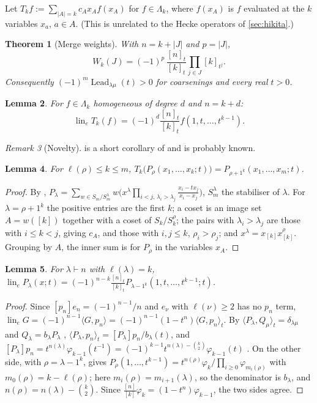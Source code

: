 \documentclass[11pt]{amsart}
\newtheorem{theorem}{Theorem}[section]
\newtheorem{lemma}[theorem]{Lemma}
\theoremstyle{definition}
\theoremstyle{remark}
\newtheorem{remark}[theorem]{Remark}
\numberwithin{equation}{section}
\newcommand{\lin}{\operatorname{lin}_e}
\newcommand{\Lead}{\operatorname{Lead}}
\newcommand{\Lam}{\Lambda}
\begin{document}
Let $T_kf:=\sum_{|A|=k}c_Ax_Af(x_A)$ for $f\in\Lam_k$, where $f(x_A)$ is $f$ evaluated at the $k$ variables $x_a$, $a\in A$. (This is unrelated to the Hecke operators of \cref{sec:hikita}.)

\begin{theorem}[Merge weights]\label{thm:W}
With $n=k+|J|$ and $p=|J|$,
\[ W_k(J)=(-1)^{p}\,\frac{[n]_t}{[k]_t}\prod_{j\in J}[k]_{t^{j}}. \]
Consequently $(-1)^m\Lead_{\lambda\mu}(t)>0$ for coarsenings and every real $t>0$.
\end{theorem}
\begin{lemma}\label{lem:linT}
For $f\in\Lam_k$ homogeneous of degree $d$ and $n=k+d$: \[\lin T_k(f)=(-1)^d\frac{[n]_t}{[k]_t}f(1,t,\dots,t^{k-1}).\]
\end{lemma}
\begin{remark}[Novelty]
 is a short corollary of \cite[III.7 Ex.~2, III (2.2)]{Macdonald95} and is probably known.
\end{remark}

\begin{lemma}\label{lem:parabolic}
For $\ell(\rho)\le k\le m$, $T_k\bigl(P_\rho(x_1,\dots,x_k;t)\bigr)=P_{\rho+1^k}(x_1,\dots,x_m;t)$.
\end{lemma}
\begin{proof}
By \cite[III (2.2)]{Macdonald95}, $P_\lambda=\sum_{w\in S_m/S_m^\lambda}w\bigl(x^\lambda\prod_{i<j,\,\lambda_i>\lambda_j}\frac{x_i-tx_j}{x_i-x_j}\bigr)$, $S_m^\lambda$ the stabiliser of $\lambda$. For $\lambda=\rho+1^k$ the positive entries are the first $k$; a coset is an image set $A=w([k])$ together with a coset of $S_k/S_k^\rho$; the pairs with $\lambda_i>\lambda_j$ are those with $i\le k<j$, giving $c_A$, and those with $i,j\le k$, $\rho_i>\rho_j$; and $x^\lambda=x_{[k]}x_{[k]}^\rho$. Grouping by $A$, the inner sum is \cite[III (2.2)]{Macdonald95} for $P_\rho$ in the variables $x_A$.
\end{proof}

\begin{lemma}\label{lem:linP}
For $\lambda\vdash n$ with $\ell(\lambda)=k$, $\lin P_\lambda(x;t)=(-1)^{n-k}\frac{[n]_t}{[k]_t}P_{\lambda-1^k}(1,t,\dots,t^{k-1};t)$.
\end{lemma}
\begin{proof}
Since $[p_n]e_n=(-1)^{n-1}/n$ and $e_\nu$ with $\ell(\nu)\ge2$ has no $p_n$ term, $\lin G=(-1)^{n-1}\langle G,p_n\rangle=(-1)^{n-1}(1-t^n)\langle G,p_n\rangle_t$. By $\langle P_\lambda,Q_\mu\rangle_t=\delta_{\lambda\mu}$ and $Q_\lambda=b_\lambda P_\lambda$ \cite[III (4.9)]{Macdonald95}, $\langle P_\lambda,p_n\rangle_t=[P_\lambda]p_n/b_\lambda(t)$, and $[P_\lambda]p_n=t^{n(\lambda)}\varphi_{k-1}(t^{-1})=(-1)^{k-1}t^{n(\lambda)-\binom k2}\varphi_{k-1}(t)$ \cite[III.7 Ex.~2]{Macdonald95}. On the other side, with $\rho=\lambda-1^k$, \cite[III.2 Ex.~1]{Macdonald95} gives $P_\rho(1,\dots,t^{k-1})=t^{n(\rho)}\varphi_k/\prod_{i\ge0}\varphi_{m_i(\rho)}$ with $m_0(\rho)=k-\ell(\rho)$; here $m_i(\rho)=m_{i+1}(\lambda)$, so the denominator is $b_\lambda$, and $n(\rho)=n(\lambda)-\binom k2$. Since $\frac{[n]}{[k]}\varphi_k=(1-t^n)\varphi_{k-1}$, the two sides agree.
\end{proof}
\end{document}
